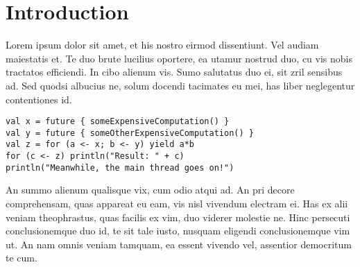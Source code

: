 %

\section{Introduction}

Lorem ipsum dolor sit amet, et his nostro eirmod dissentiunt. Vel audiam
maiestatis et. Te duo brute lucilius oportere, ea utamur nostrud duo, cu vis
nobis tractatos efficiendi. In cibo alienum vis. Sumo salutatus duo ei, sit zril
sensibus ad. Sed quodsi albucius ne, solum docendi tacimates eu mei, has liber
neglegentur contentiones id.

\begin{verbatim}
val x = future { someExpensiveComputation() }
val y = future { someOtherExpensiveComputation() }
val z = for (a <- x; b <- y) yield a*b
for (c <- z) println("Result: " + c)
println("Meanwhile, the main thread goes on!")
\end{verbatim}

An summo alienum qualisque vix, cum odio atqui ad. An pri decore comprehensam,
quas appareat eu eam, vis nisl vivendum electram ei. Has ex alii veniam
theophrastus, quas facilis ex vim, duo viderer molestie ne. Hinc persecuti
conclusionemque duo id, te sit tale iusto, nusquam eligendi conclusionemque vim
ut. An nam omnis veniam tamquam, ea essent vivendo vel, assentior democritum te
cum.


